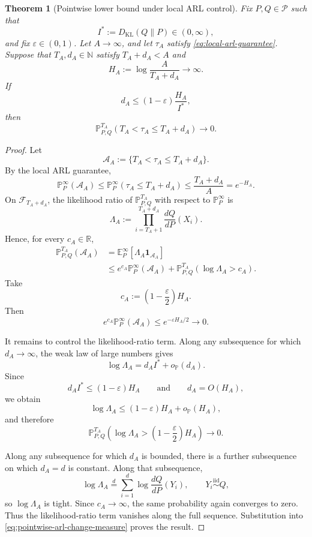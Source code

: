 \documentclass[12pt]{article}
\theoremstyle{spaced}
\newtheorem{theorem}{Theorem}[section]
\theoremstyle{remark}
\begin{document}
\begin{theorem}[Pointwise lower bound under local ARL control]
\label{thm:pointwise-arl-lower}
Fix \(P,Q\in\mathcal P\) such that
\[
    I^*:=D_{\mathrm{KL}}(Q\|P)\in(0,\infty),
\]
and fix \(\varepsilon\in(0,1)\). Let \(A\to\infty\), and let
\(\tau_A\) satisfy \eqref{eq:local-arl-guarantee}. Suppose that
\(T_A,d_A\in\mathbb N\) satisfy \(T_A+d_A<A\) and
\[
    H_A
    :=
    \log\frac{A}{T_A+d_A}
    \longrightarrow\infty.
\]
If
\[
    d_A
    \le
    (1-\varepsilon)\frac{H_A}{I^*},
\]
then
\[
    \mathbb P_{P,Q}^{T_A}
    \left(
        T_A<\tau_A\le T_A+d_A
    \right)
    \longrightarrow0.
\]
\end{theorem}

\begin{proof}
Let
\[
    \mathcal A_A
    :=
    \{T_A<\tau_A\le T_A+d_A\}.
\]
By the local ARL guarantee,
\[
    \mathbb P_P^\infty(\mathcal A_A)
    \le
    \mathbb P_P^\infty(\tau_A\le T_A+d_A)
    \le
    \frac{T_A+d_A}{A}
    =
    e^{-H_A}.
\]
On \(\mathcal F_{T_A+d_A}\), the likelihood ratio of
\(\mathbb P_{P,Q}^{T_A}\) with respect to \(\mathbb P_P^\infty\) is
\[
    \Lambda_A
    :=
    \prod_{i=T_A+1}^{T_A+d_A}
    \frac{dQ}{dP}(X_i).
\]
Hence, for every \(c_A\in\mathbb R\),
\begin{align}
    \mathbb P_{P,Q}^{T_A}(\mathcal A_A)
    &=
    \mathbb E_P^\infty
    \left[
        \Lambda_A\mathbf 1_{\mathcal A_A}
    \right]
    \nonumber\\
    &\le
    e^{c_A}\mathbb P_P^\infty(\mathcal A_A)
    +
    \mathbb P_{P,Q}^{T_A}
    (\log\Lambda_A>c_A).
    \label{eq:pointwise-arl-change-measure}
\end{align}
Take
\[
    c_A
    :=
    \left(1-\frac{\varepsilon}{2}\right)H_A.
\]
Then
\[
    e^{c_A}\mathbb P_P^\infty(\mathcal A_A)
    \le
    e^{-\varepsilon H_A/2}
    \longrightarrow0.
\]

It remains to control the likelihood-ratio term. Along any
subsequence for which \(d_A\to\infty\), the weak law of large numbers
gives
\[
    \log\Lambda_A
    =
    d_AI^*+o_{\mathbb P}(d_A).
\]
Since
\[
    d_AI^*
    \le
    (1-\varepsilon)H_A
    \qquad\text{and}\qquad
    d_A=O(H_A),
\]
we obtain
\[
    \log\Lambda_A
    \le
    (1-\varepsilon)H_A+o_{\mathbb P}(H_A),
\]
and therefore
\[
    \mathbb P_{P,Q}^{T_A}
    \left(
        \log\Lambda_A>
        \left(1-\frac{\varepsilon}{2}\right)H_A
    \right)
    \longrightarrow0.
\]

Along any subsequence for which \(d_A\) is bounded, there is a further
subsequence on which \(d_A=d\) is constant. Along that subsequence,
\[
    \log\Lambda_A
    \stackrel{d}{=}
    \sum_{i=1}^d
    \log\frac{dQ}{dP}(Y_i),
    \qquad
    Y_i\stackrel{\mathrm{iid}}{\sim}Q,
\]
so \(\log\Lambda_A\) is tight. Since \(c_A\to\infty\), the same
probability again converges to zero. Thus the likelihood-ratio term
vanishes along the full sequence. Substitution into
\eqref{eq:pointwise-arl-change-measure} proves the result.
\end{proof}
\end{document}
